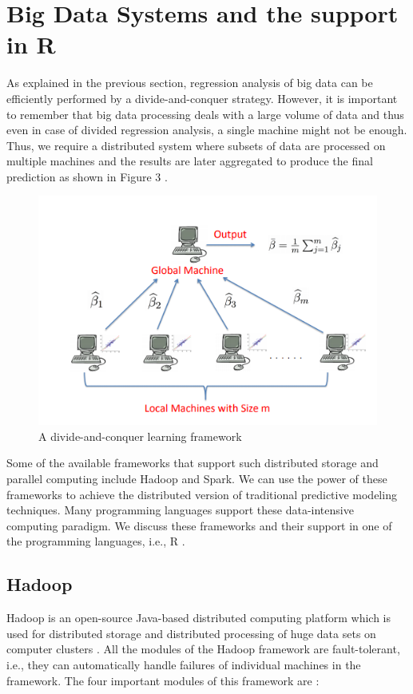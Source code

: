 \documentclass[sigconf]{acmart}
\begin{document}
\section{Big Data Systems and the support in R}
As explained in the previous section, regression analysis of big data can be efficiently performed by a divide-and-conquer strategy. However, it is important to remember that big data processing deals with a large volume of data and thus even in case of divided regression analysis, a single machine might not be enough. Thus, we require a distributed system where subsets of data are processed on multiple machines and the results are later aggregated to produce the final prediction as shown in Figure 3 \cite{dkr-reg}.
\begin{figure}[!ht]
  \centering\includegraphics[width=\columnwidth]{images/Fig3.png}
  \caption{A divide-and-conquer learning framework \cite{dkr-reg}}
  \label{Figure 3}
\end{figure}
Some of the available frameworks that support such distributed storage and parallel computing include Hadoop and Spark. We can use the power of these frameworks to achieve the distributed version of traditional predictive modeling techniques. Many programming languages support these data-intensive computing paradigm. We discuss these frameworks and their support in one of the programming languages, i.e., R \cite{log-reg}.

\subsection{Hadoop} 
Hadoop is an open-source Java-based distributed computing platform which is used for distributed storage and distributed processing of huge data sets on computer clusters \cite{log-reg}. All the modules of the Hadoop framework are fault-tolerant, i.e., they can automatically handle failures of individual machines in the framework. The four important modules of this framework are \cite{log-reg}:
\end{document}

